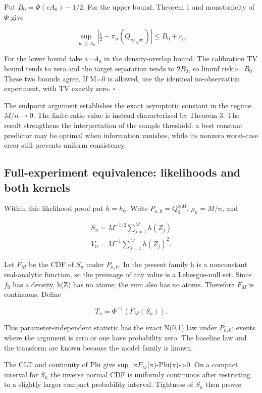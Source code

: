 Put \(B_0=\Phi(cA_0)-1/2\). For the upper bound, Theorem 1 and monotonicity of \(\Phi\) give

\[
\sup_{|u|\le A_0}|\tfrac12-\pi_n(Q_{u/\sqrt n})|
\le B_0+r_n.
\]

For the lower bound take a=\(A_0\) in the density-overlap bound. The calibration TV bound tends to zero and the target separation tends to \(2B_0\), so liminf risk\textgreater=\(B_0\). These two bounds agree. If M=0 is allowed, use the identical no-observation experiment, with TV exactly zero. \(\square\)

The endpoint argument establishes the exact asymptotic constant in the regime \(M/n\to0\). The finite-ratio value is instead characterized by Theorem 3. The result strengthens the interpretation of the sample threshold: a best constant predictor may be optimal when information vanishes, while its nonzero worst-case error still prevents uniform consistency.

\subsection{Full-experiment equivalence: likelihoods and both kernels}\label{full-experiment-equivalence-likelihoods-and-both-kernels}

Within this likelihood proof put \(h=h_0\). Write \(P_{n,0}=Q_0^{\otimes M}\), \(\rho_n=M/n\), and

\[
\begin{gathered}
S_n=M^{-1/2}\sum_{j=1}^M h(Z_j) \\
V_n=M^{-1}\sum_{j=1}^M h(Z_j)^2.
\end{gathered}
\]

Let \(F_M\) be the CDF of \(S_n\) under \(P_{n,0}\). In the present family h is a nonconstant real-analytic function, so the preimage of any value is a Lebesgue-null set. Since \(f_0\) has a density, h(Z) has no atoms; the sum also has no atoms. Therefore \(F_M\) is continuous. Define

\[
T_n=\Phi^{-1}(F_M(S_n)).
\]

This parameter-independent statistic has the exact N(0,1) law under \(P_{n,0}\); events where the argument is zero or one have probability zero. The baseline law and the transform are known because the model family is known.

The CLT and continuity of Phi give sup\_x\textbar{}\(F_M\)(x)-Phi(x)\textbar-\textgreater0. On a compact interval for \(S_n\) the inverse normal CDF is uniformly continuous after restricting to a slightly larger compact probability interval. Tightness of \(S_n\) then proves


